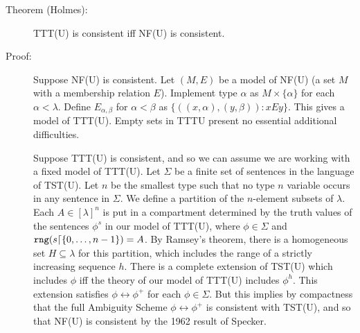 \documentclass[12pt]{article}
\begin{document}
\begin{description}

\item[Theorem (Holmes):]  TTT(U) is consistent iff NF(U) is consistent.

\item[Proof:]  Suppose NF(U) is consistent.  Let $(M,E)$ be a model of NF(U) (a set $M$ with a membership relation $E$).  Implement type $\alpha$ as $M \times \{\alpha\}$ for
each $\alpha<\lambda$.  Define $E_{\alpha,\beta}$ for $\alpha<\beta$ as $\{((x,\alpha),(y,\beta)):xEy\}$.  This gives a model of TTT(U).   Empty sets in TTTU present no essential additional difficulties.

Suppose TTT(U) is consistent, and so we can assume we are working with a fixed model of TTT(U).  Let $\Sigma$ be a finite set of sentences in the language of TST(U).  Let $n$ be the smallest type such that no type $n$ variable occurs in any sentence in $\Sigma$.  We define a partition of the $n$-element subsets of $\lambda$.  Each $A \in [\lambda]^n$ is put in a compartment
determined by the truth values of the sentences $\phi^s$ in our model of TTT(U), where $\phi \in \Sigma$ and ${\tt rng}(s \lceil \{0,\ldots,n-1\}) = A$.  By Ramsey's theorem, there is a homogeneous set $H \subseteq \lambda$ for this partition, which includes the range of a strictly increasing sequence $h$.  There is a complete extension of TST(U) which includes
$\phi$ iff the theory of our model of TTT(U) includes $\phi^h$.  This extension satisfies $\phi \leftrightarrow \phi^+$ for each $\phi \in \Sigma$.  But this implies by compactness that the full Ambiguity Scheme $\phi \leftrightarrow \phi^+$ is consistent with TST(U), and so that NF(U) is consistent by the 1962 result of Specker.


\end{description}
\end{document}
